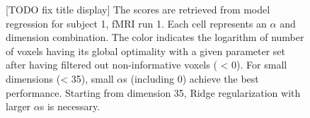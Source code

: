 \begin{figure}
    \centering
    
            \caption[Session Best Hyper-parameter Configuration Voxel-Count Heat-map]{[TODO fix title display] The scores are retrieved from  model regression for subject 1, fMRI run 1. Each cell represents an \(\alpha\) and dimension combination. The color indicates the logarithm of number of voxels having its global optimality with a given parameter set after having filtered out non-informative voxels ( < 0). For small dimensions (< 35), small \(\alpha\)s (including 0) achieve the best performance. Starting from dimension 35, Ridge regularization with larger \(\alpha\)s is necessary.} 
            \label{fig:MIX_HeatmapAlphaDimS1R1}
   
\end{figure}

